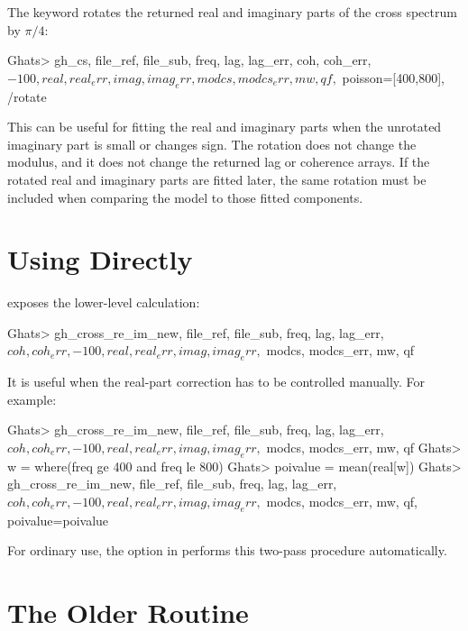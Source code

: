 The  keyword rotates the returned real and imaginary parts of
the cross spectrum by \(\pi/4\):

\begin{ghatsconsole}
Ghats> gh_cs, file_ref, file_sub, freq, lag, lag_err, coh, coh_err, $
       -100, real, real_err, imag, imag_err, modcs, modcs_err, mw, qf, $
       poisson=[400,800], /rotate
\end{ghatsconsole}

This can be useful for fitting the real and imaginary parts when the
unrotated imaginary part is small or changes sign.  The rotation does not
change the modulus, and it does not change the returned lag or coherence
arrays.  If the rotated real and imaginary parts are fitted later, the same
rotation must be included when comparing the model to those fitted
components.

\section{Using  Directly}

 exposes the lower-level calculation:

\begin{ghatsconsole}
Ghats> gh_cross_re_im_new, file_ref, file_sub, freq, lag, lag_err, $
       coh, coh_err, -100, real, real_err, imag, imag_err, $
       modcs, modcs_err, mw, qf
\end{ghatsconsole}

It is useful when the real-part correction has to be controlled manually.
For example:

\begin{ghatsconsole}
Ghats> gh_cross_re_im_new, file_ref, file_sub, freq, lag, lag_err, $
       coh, coh_err, -100, real, real_err, imag, imag_err, $
       modcs, modcs_err, mw, qf
Ghats> w = where(freq ge 400 and freq le 800)
Ghats> poivalue = mean(real[w])
Ghats> gh_cross_re_im_new, file_ref, file_sub, freq, lag, lag_err, $
       coh, coh_err, -100, real, real_err, imag, imag_err, $
       modcs, modcs_err, mw, qf, poivalue=poivalue
\end{ghatsconsole}

For ordinary use, the  option in 
performs this two-pass procedure automatically.

\section{The Older  Routine}

